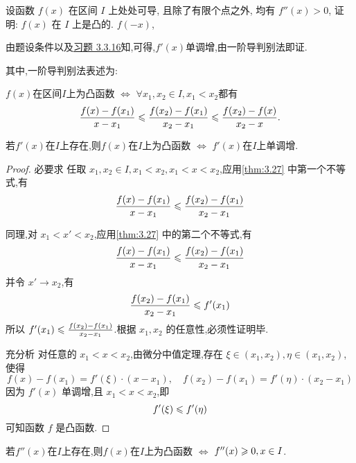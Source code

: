 \begin{exercise}[3.5.5]
    设函数 $f(x)$ 在区间 $I$ 上处处可导, 且除了有限个点之外, 均有 $f''(x) > 0$, 证明: $f(x)$ 在 $I$ 上是凸的.  $f(-x)$, 
\end{exercise}

\begin{solution}
    由题设条件以及\hyperref[ex:3.3.16]{习题 3.3.16}知,可得,$f'(x)$单调增,由一阶导判别法即证.
\end{solution}

其中,一阶导判别法表述为:
\begin{theorem*}[零阶导判别法]\label{thm:3.27}
    $f(x)$在区间$I$上为凸函数 $\Leftrightarrow$ $\forall x_1,x_2 \in I, x_1<x_2$都有 $$\dfrac{f(x) - f(x_1)}{x-x_1} \leqslant \dfrac{f(x_2) - f(x_1)}{x_2-x_1} \leqslant \dfrac{f(x_2) - f(x)}{x_2 - x}.$$
\end{theorem*}

\begin{theorem*}[一阶导判别法]
    若$f'(x)$在$I$上存在,则$f(x)$在$I$上为凸函数 $\Leftrightarrow$ $f'(x)$在$I$上单调增.
\end{theorem*}

\begin{proof}
    必要求  任取 $x_1, x_2 \in I, x_1 < x_2, x_1 < x < x_2$,应用\autoref{thm:3.27} 中第一个不等式,有
    $$
        \frac{f(x) - f(x_1)}{x - x_1} \leqslant \frac{f(x_2) - f(x_1)}{x_2 - x_1}
    $$

    同理,对 $x_1 < x' < x_2$,应用\autoref{thm:3.27} 中的第二个不等式,有
    $$
        \frac{f(x) - f(x_1)}{x - x_1} \leqslant \frac{f(x_2) - f(x_1)}{x_2 - x_1}
    $$
    并令 $x' \to x_2$,有
    $$
        \frac{f(x_2) - f(x_1)}{x_2 - x_1} \leqslant f'(x_1)
    $$
    所以 $f'(x_1) \leqslant \frac{f(x_2) - f(x_1)}{x_2 - x_1}$.根据 $x_1, x_2$ 的任意性,必须性证明毕.

    充分析 对任意的 $x_1 < x < x_2$,由微分中值定理,存在 $\xi \in (x_1, x_2), \eta \in (x_1, x_2)$,使得
    $$
        f(x) - f(x_1) = f'(\xi) \cdot (x - x_1), \quad f(x_2) - f(x_1) = f'(\eta) \cdot (x_2 - x_1)
    $$
    因为 $f'(x)$ 单调增,且 $x_1 < x < x_2$,即
    $$
        f'(\xi) \leqslant f'(\eta)
    $$
    可知函数 $f$ 是凸函数.
\end{proof}

\begin{theorem*}[二阶导判别法]\label{thm:3.28}
    若$f''(x)$在$I$上存在,则$f(x)$在$I$上为凸函数 $\Leftrightarrow$ $f''(x) \geqslant 0, x \in I$.
\end{theorem*}

